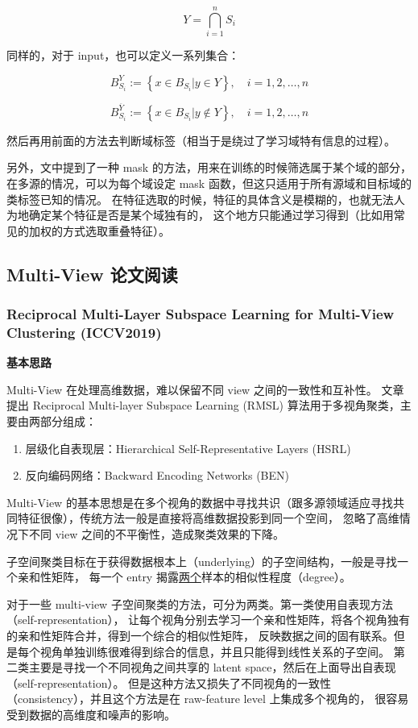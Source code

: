 \documentclass[UTF8]{ctexart}
\begin{document}
$$
Y = \bigcap_{i=1}^n S_i
$$

同样的，对于 input，也可以定义一系列集合：

$$
B_{S_i}^Y := \left\{x\in B_{S_i} | y\in Y\right\},\quad i = 1, 2, \dots, n
$$

$$
B_{S_i}^{\overline{Y}} := \left\{x\in B_{S_i} | y\notin Y\right\},\quad i = 1, 2, \dots, n
$$

然后再用前面的方法去判断域标签（相当于是绕过了学习域特有信息的过程）。

另外，文中提到了一种 mask 的方法，用来在训练的时候筛选属于某个域的部分，
在多源的情况，可以为每个域设定 mask 函数，但这只适用于所有源域和目标域的类标签已知的情况。
在特征选取的时候，特征的具体含义是模糊的，也就无法人为地确定某个特征是否是某个域独有的，
这个地方只能通过学习得到（比如用常见的加权的方式选取重叠特征）。

\subsection{Multi-View 论文阅读}
\subsubsection{Reciprocal Multi-Layer Subspace Learning for Multi-View Clustering (ICCV2019)}

\textbf{基本思路}

Multi-View 在处理高维数据，难以保留不同 view 之间的一致性和互补性。
文章提出 Reciprocal Multi-layer Subspace Learning (RMSL) 算法用于多视角聚类，主要由两部分组成：

\begin{enumerate}
    \item 层级化自表现层：Hierarchical Self-Representative Layers (HSRL)
    \item 反向编码网络：Backward Encoding Networks (BEN)
\end{enumerate}

Multi-View 的基本思想是在多个视角的数据中寻找共识（跟多源领域适应寻找共同特征很像），传统方法一般是直接将高维数据投影到同一个空间，
忽略了高维情况下不同 view 之间的不平衡性，造成聚类效果的下降。

子空间聚类目标在于获得数据根本上（underlying）的子空间结构，一般是寻找一个亲和性矩阵，
每一个 entry 揭露\underline{两个}样本的相似性程度（degree）。

对于一些 multi-view 子空间聚类的方法，可分为两类。第一类使用自表现方法（self-representation），
让每个视角分别去学习一个亲和性矩阵，将各个视角独有的亲和性矩阵合并，得到一个综合的相似性矩阵，
反映数据之间的固有联系。但是每个视角单独训练很难得到综合的信息，并且只能得到线性关系的子空间。
第二类主要是寻找一个不同视角之间共享的 latent space，然后在上面导出自表现（self-representation）。
但是这种方法又损失了不同视角的一致性（consistency），并且这个方法是在 raw-feature level 上集成多个视角的，
很容易受到数据的高维度和噪声的影响。
\end{document}
